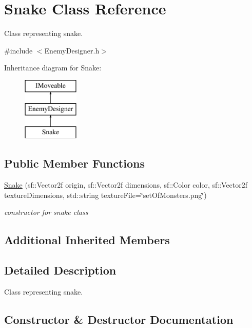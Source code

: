 \hypertarget{class_snake}{}\section{Snake Class Reference}
\label{class_snake}


Class representing snake.  




{\ttfamily \#include $<$Enemy\+Designer.\+h$>$}

Inheritance diagram for Snake\+:\begin{figure}[H]
\begin{center}
\leavevmode
\includegraphics[height=3.000000cm]{class_snake}
\end{center}
\end{figure}
\subsection*{Public Member Functions}
\begin{DoxyCompactItemize}
\item 
\mbox{\hyperlink{class_snake_a92f93daaa158c71469ee4ba468922442}{Snake}} (sf\+::\+Vector2f origin, sf\+::\+Vector2f dimensions, sf\+::\+Color color, sf\+::\+Vector2f texture\+Dimensions, std\+::string texture\+File=\char`\"{}set\+Of\+Monsters.\+png\char`\"{})
\begin{DoxyCompactList}\small\item\em constructor for snake class \end{DoxyCompactList}\end{DoxyCompactItemize}
\subsection*{Additional Inherited Members}


\subsection{Detailed Description}
Class representing snake. 

\subsection{Constructor \& Destructor Documentation}
\mbox{\label{class_snake_a92f93daaa158c71469ee4ba468922442}} 
